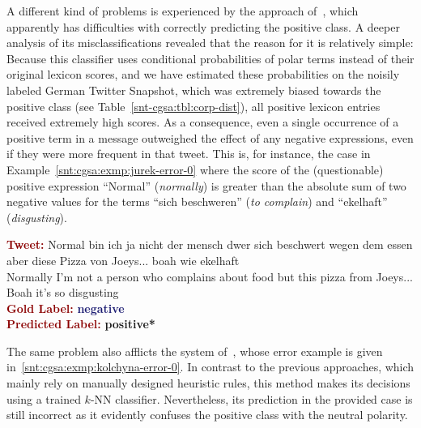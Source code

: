 A different kind of problems is experienced by the approach
of~\citet{Jurek:15}, which apparently has difficulties with correctly
predicting the positive class.  A deeper analysis of its
misclassifications revealed that the reason for it is relatively
simple: Because this classifier uses conditional probabilities of
polar terms instead of their original lexicon scores, and we have
estimated these probabilities on the noisily labeled German Twitter
Snapshot, which was extremely biased towards the positive class (see
Table~\ref{snt-cgsa:tbl:corp-dist}), all positive lexicon entries
received extremely high scores.  As a consequence, even a single
occurrence of a positive term in a message outweighed the effect of
any negative expressions, even if they were more frequent in that
tweet.  This is, for instance, the case in
Example~\ref{snt:cgsa:exmp:jurek-error-0} where the score of the
(questionable) positive expression ``Normal'' (\emph{normally}) is
greater than the absolute sum of two negative values for the terms
``sich beschweren'' (\emph{to complain}) and ``ekelhaft''
(\emph{disgusting}).

\begin{example}\label{snt:cgsa:exmp:jurek-error-0}
  \noindent\textup{\bfseries\textcolor{darkred}{Tweet:}} {\upshape
    Normal bin ich ja nicht der mensch dwer sich beschwert wegen dem essen aber diese Pizza von Joeys... boah wie ekelhaft}\\
  \noindent Normally I'm not a person who complains about food but
  this pizza from Joeys... Boah it's so disgusting\\[0.65em]
  \noindent\textup{\bfseries\textcolor{darkred}{Gold Label:}}\hspace*{4.3em}\textbf{%
    \upshape\textcolor{midnightblue}{negative}}\\
 \noindent\textup{\bfseries\textcolor{darkred}{Predicted Label:}}\hspace*{2em}\textbf{%
    \upshape\textcolor{green3}{positive*}}\\
\end{example}

The same problem also afflicts the system of~\citeauthor{Kolchyna:15},
whose error example is given in~\ref{snt:cgsa:exmp:kolchyna-error-0}.
In contrast to the previous approaches, which mainly rely on manually
designed heuristic rules, this method makes its decisions using a
trained $k$-NN classifier.  Nevertheless, its prediction in the
provided case is still incorrect as it evidently confuses the positive
class with the neutral polarity.

